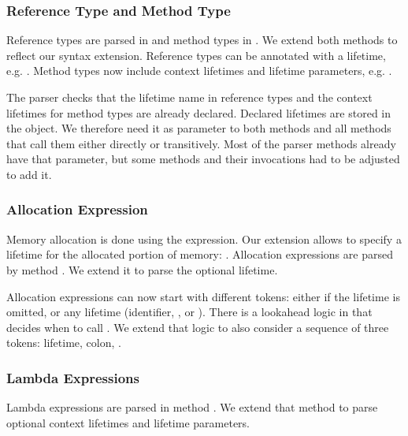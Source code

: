 \subsubsection{Reference Type and Method Type}
\begin{sloppypar}
Reference types are parsed in  and method types in .
We extend both methods to reflect our syntax extension.
Reference types can be annotated with a lifetime, e.g. .
Method types now include context lifetimes and lifetime parameters, e.g. .
\end{sloppypar}

The parser checks that the lifetime name in reference types and the context lifetimes for method types are already declared.
Declared lifetimes are stored in the  object.
We therefore need it as parameter to both methods and all methods that call them either directly or transitively.
Most of the parser methods already have that parameter, but some methods and their invocations had to be adjusted to add it.


\subsubsection{Allocation Expression}
Memory allocation is done using the  expression.
Our extension allows to specify a lifetime for the allocated portion of memory:
.
Allocation expressions are parsed by method .
We extend it to parse the optional lifetime.

Allocation expressions can now start with different tokens:
either  if the lifetime is omitted, or any lifetime (identifier, , or \whileyinline{*}).
There is a lookahead logic in  that decides when to call .
We extend that logic to also consider a sequence of three tokens:
lifetime, colon, .

\subsubsection{Lambda Expressions}
Lambda expressions are parsed in method .
We extend that method to parse optional context lifetimes and lifetime parameters.
